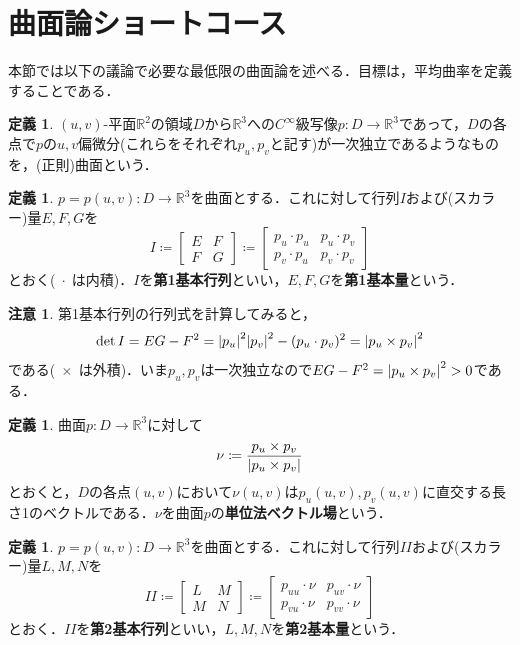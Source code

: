 \documentclass[a4j]{ltjsarticle}
\newcommand{\Rset}{\mathbb{R}}
\numberwithin{equation}{section}
\theoremstyle{definition}
\newtheorem{dfn}[thm]{定義}
\newtheorem{rmk}[thm]{注意}
\begin{document}
\section{曲面論ショートコース}
本節では以下の議論で必要な最低限の曲面論を述べる．目標は，平均曲率を定義することである．
\begin{dfn}\label{dfn:curve}
    $(u,v)$-平面$\Rset^2$の領域$D$から$\Rset^3$への$C^\infty$級写像$p:D\to \Rset^3$であって，$D$の各点で$p$の$u,v$偏微分(これらをそれぞれ$p_u,p_v$と記す)が一次独立であるようなものを，(正則)曲面という．
\end{dfn}
\begin{dfn}\label{dfn:1st}
    $p=p(u,v):D\to \Rset^3$を曲面とする．これに対して行列$I$および(スカラー)量$E,F,G$を
    \begin{equation}
        I\coloneq \begin{bmatrix}
            E & F\\
            F & G 
        \end{bmatrix}\coloneq \begin{bmatrix}
            p_u\cdot p_u & p_u\cdot p_v \\
            p_v\cdot p_u & p_v\cdot p_v
        \end{bmatrix} 
    \end{equation}
    とおく($\;\cdot\;$は内積)．$I$を\textbf{第1基本行列}といい，$E,F,G$を\textbf{第1基本量}という．
\end{dfn}
\begin{rmk}
    第1基本行列の行列式を計算してみると，
    \begin{equation}
        \det I=EG-F^2=\abs{p_u}^2\abs{p_v}^2-(p_u\cdot p_v)^2=\abs{p_u\times p_v}^2\label{eq:det_1st}
    \end{equation}
    である($\;\times\;$は外積)．いま$p_u,p_v$は一次独立なので$EG-F^2=\abs{p_u\times p_v}^2>0$である．
\end{rmk}
\begin{dfn}
    曲面$p:D\to \Rset^3$に対して 
    \begin{equation}
        \nu\coloneq \frac{p_u\times p_v}{\abs{p_u\times p_v}}
    \end{equation}
    とおくと，$D$の各点$(u,v)$において$\nu(u,v)$は$p_u(u,v),p_v(u,v)$に直交する長さ1のベクトルである．$\nu$を曲面$p$の\textbf{単位法ベクトル場}という．
\end{dfn}
\begin{dfn}
    $p=p(u,v):D\to \Rset^3$を曲面とする．これに対して行列$I\!I$および(スカラー)量$L,M,N$を
    \begin{equation}
        I\!I\coloneq \begin{bmatrix}
            L & M\\
            M & N 
        \end{bmatrix}\coloneq \begin{bmatrix}
            p_{uu}\cdot \nu & p_{uv}\cdot \nu \\
            p_{vu}\cdot \nu & p_{vv}\cdot \nu
        \end{bmatrix} 
    \end{equation}
    とおく．$I\!I$を\textbf{第2基本行列}といい，$L,M,N$を\textbf{第2基本量}という．
\end{dfn}
\end{document}
